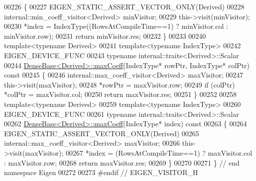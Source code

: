 \begin{DoxyCode}
00226 \textcolor{keyword}{}\{
00227   EIGEN\_STATIC\_ASSERT\_VECTOR\_ONLY(Derived)
00228   internal::min\_coeff\_visitor<Derived> minVisitor;
00229   this->visit(minVisitor);
00230   *index = IndexType((RowsAtCompileTime==1) ? minVisitor.col : minVisitor.row);
00231   \textcolor{keywordflow}{return} minVisitor.res;
00232 \}
00233 
00240 \textcolor{keyword}{template}<\textcolor{keyword}{typename} Derived>
00241 \textcolor{keyword}{template}<\textcolor{keyword}{typename} IndexType>
00242 EIGEN\_DEVICE\_FUNC
00243 \textcolor{keyword}{typename} internal::traits<Derived>::Scalar
00244 \hyperlink{group___core___module_ac0d151ec47eb7a44a3a5ba1587ddbeb4}{DenseBase<Derived>::maxCoeff}(IndexType* rowPtr, IndexType* colPtr)\textcolor{keyword}{ const}
00245 \textcolor{keyword}{}\{
00246   internal::max\_coeff\_visitor<Derived> maxVisitor;
00247   this->visit(maxVisitor);
00248   *rowPtr = maxVisitor.row;
00249   \textcolor{keywordflow}{if} (colPtr) *colPtr = maxVisitor.col;
00250   \textcolor{keywordflow}{return} maxVisitor.res;
00251 \}
00252 
00258 \textcolor{keyword}{template}<\textcolor{keyword}{typename} Derived>
00259 \textcolor{keyword}{template}<\textcolor{keyword}{typename} IndexType>
00260 EIGEN\_DEVICE\_FUNC
00261 \textcolor{keyword}{typename} internal::traits<Derived>::Scalar
00262 \hyperlink{group___core___module_ac0d151ec47eb7a44a3a5ba1587ddbeb4}{DenseBase<Derived>::maxCoeff}(IndexType* index)\textcolor{keyword}{ const}
00263 \textcolor{keyword}{}\{
00264   EIGEN\_STATIC\_ASSERT\_VECTOR\_ONLY(Derived)
00265   internal::max\_coeff\_visitor<Derived> maxVisitor;
00266   this->visit(maxVisitor);
00267   *index = (RowsAtCompileTime==1) ? maxVisitor.col : maxVisitor.row;
00268   \textcolor{keywordflow}{return} maxVisitor.res;
00269 \}
00270 
00271 \} \textcolor{comment}{// end namespace Eigen}
00272 
00273 \textcolor{preprocessor}{#endif // EIGEN\_VISITOR\_H}
\end{DoxyCode}
